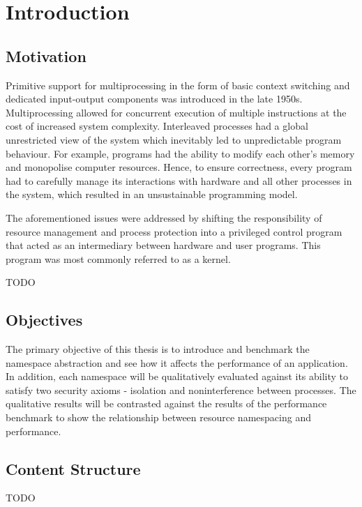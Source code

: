 \chapter{Introduction}
\section{Motivation}
Primitive support for multiprocessing in the form of basic context switching and dedicated input-output 
components was introduced in the late 1950s. Multiprocessing allowed for concurrent execution of 
multiple instructions at the cost of increased system complexity. Interleaved processes had a 
global unrestricted view of the system which inevitably led to unpredictable program behaviour. 
For example, programs had the ability to modify each other's memory and monopolise 
computer resources. Hence, to ensure correctness, every program had to carefully manage its interactions 
with hardware and all other processes in the system, which resulted in an unsustainable 
programming model.

The aforementioned issues were addressed by shifting the responsibility of resource management 
and process protection into a privileged control program that acted as an intermediary between 
hardware and user programs. This program was most commonly referred to as a kernel. 


TODO
\section{Objectives}
The primary objective of this thesis is to introduce and benchmark the namespace abstraction 
and see how it affects the performance of an application. In addition, each namespace will be 
qualitatively evaluated against its ability to satisfy two security axioms - isolation and noninterference 
between processes. The qualitative results will be contrasted against the results of the 
performance benchmark to show the relationship between resource namespacing and performance. 

\section{Content Structure}
TODO